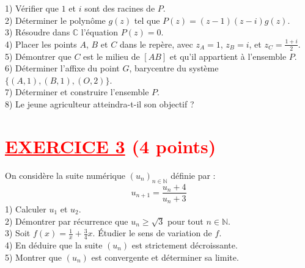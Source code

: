 \documentclass[12pt]{article}
\begin{document}
1) Vérifier que \(1\) et \(i\) sont des racines de \(P\). \\
2) Déterminer le polynôme \( g(z) \) tel que \( P(z) = (z-1)(z-i)g(z) \). \\
3) Résoudre dans \( \mathbb{C} \) l'équation \( P(z) = 0 \). \\
4) Placer les points \( A \), \( B \) et \( C \) dans le repère, avec \( z_A = 1 \), \( z_B = i \), et \( z_C = \frac{1+i}{2} \). \\
5) Démontrer que \( C \) est le milieu de \( [AB] \) et qu'il appartient à l'ensemble \( P \). \\
6) Déterminer l'affixe du point \( G \), barycentre du système \( \{(A,1), (B,1), (O,2)\} \). \\
7) Déterminer et construire l'ensemble \( P \). \\
8) Le jeune agriculteur atteindra-t-il son objectif ?

\section*{\textcolor{red}{\underline{EXERCICE 3} (4 points) }}
On considère la suite numérique \( (u_n)_{n \in \mathbb{N}} \) définie par :
\[
u_{n+1} = \frac{u_n + 4}{u_n + 3}
\]
1) Calculer \( u_1 \) et \( u_2 \). \\
2) Démontrer par récurrence que \( u_n \geq \sqrt{3} \) pour tout \( n \in \mathbb{N} \). \\
3) Soit \( f(x) = \frac{1}{x} + \frac{3}{4}x \). Étudier le sens de variation de \( f \). \\
4) En déduire que la suite \( (u_n) \) est strictement décroissante. \\
5) Montrer que \( (u_n) \) est convergente et déterminer sa limite.

\end{document}
